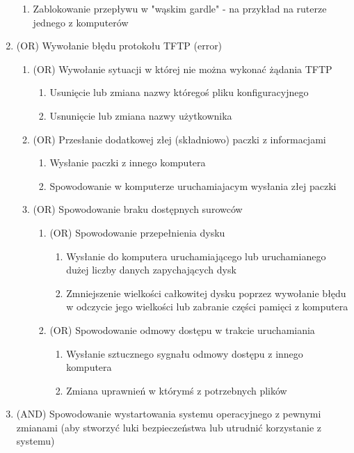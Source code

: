 \documentclass{article}
\begin{document}
\begin{enumerate}[label*=\arabic*.]
\begin{enumerate}[label*=\arabic*.]
      \item Zablokowanie przepływu w "wąskim gardle"  - na przykład na ruterze jednego z komputerów
    \end{enumerate}
  \item (OR) Wywołanie błędu protokołu TFTP (error)
  \begin{enumerate}[label*=\arabic*.]
    \item (OR) Wywołanie sytuacji w której nie można wykonać żądania TFTP
    \begin{enumerate}[label*=\arabic*.]
      \item Usunięcie lub zmiana nazwy któregoś pliku konfiguracyjnego
      \item Usnunięcie lub zmiana nazwy użytkownika
    \end{enumerate}
    \item (OR) Przesłanie dodatkowej złej (składniowo) paczki z informacjami
    \begin{enumerate}[label*=\arabic*.]
      \item Wysłanie paczki z innego komputera
      \item Spowodowanie w komputerze uruchamiajacym wysłania złej paczki
    \end{enumerate}
    \item (OR) Spowodowanie braku dostępnych surowców
    \begin{enumerate}[label*=\arabic*.]
      \item (OR) Spowodowanie przepełnienia dysku
      \begin{enumerate}[label*=\arabic*.]
	\item Wysłanie do komputera uruchamiającego lub uruchamianego dużej liczby danych zapychających dysk
	\item Zmniejszenie wielkości całkowitej dysku poprzez wywołanie błędu w odczycie jego wielkości lub zabranie części pamięci z komputera
      \end{enumerate}
      \item (OR) Spowodowanie odmowy dostępu w trakcie uruchamiania
      \begin{enumerate}[label*=\arabic*.]
	\item Wysłanie sztucznego sygnału odmowy dostępu z innego komputera
	\item Zmiana uprawnień w którymś z potrzebnych plików
      \end{enumerate}    
    \end{enumerate}
  \end{enumerate}
  \item (AND) Spowodowanie wystartowania systemu operacyjnego z pewnymi zmianami (aby stworzyć luki bezpieczeństwa lub utrudnić korzystanie z systemu)

\end{enumerate}
\end{document}
